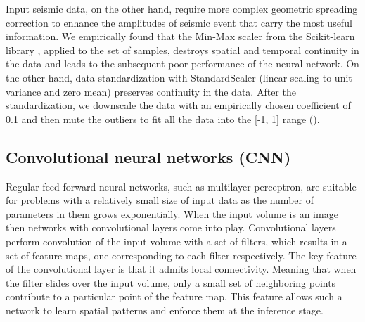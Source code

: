 \documentclass[manuscript]{geophysics}
\begin{document}
Input seismic data, on the other hand, require more complex geometric spreading correction to enhance the amplitudes of seismic event that carry the most useful information.
%
We empirically found that the Min-Max scaler from the Scikit-learn library \citep{scikit-learn}, applied to the set of samples, destroys spatial and temporal continuity in the data and leads to the subsequent poor performance of the neural network. On the other hand, data standardization with StandardScaler (linear scaling to unit variance and zero mean) preserves continuity in the data. After the standardization, we downscale the data with an empirically chosen coefficient of 0.1 and then mute the outliers to fit all the data into the [-1, 1] range ().



\subsection{Convolutional neural networks (CNN)}
Regular feed-forward neural networks, such as multilayer perceptron, are suitable for problems with a relatively small size of input data as the number of parameters in them grows exponentially. When the input volume is an image then networks with convolutional layers come into play. Convolutional layers perform convolution of the input volume with a set of filters, which results in a set of feature maps, one corresponding to each filter respectively. The key feature of the convolutional layer is that it admits local connectivity. Meaning that when the filter slides over the input volume, only a small set of neighboring points contribute to a particular point of the feature map. This feature allows such a network to learn spatial patterns and enforce them at the inference stage.
\end{document}
